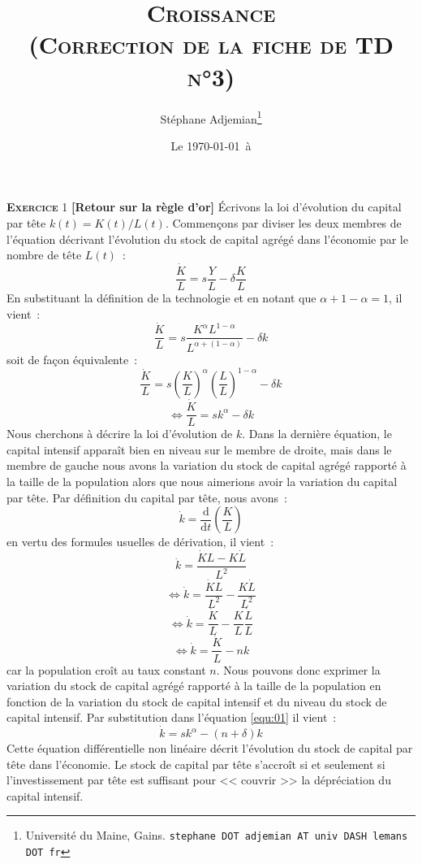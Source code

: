 \documentclass[10pt,a4paper,notitlepage,onecolumn]{article}
\title{\textsc{Croissance\\ \small{(Correction de la fiche de TD n°3)}}}
\author{Stéphane Adjemian\thanks{Université du Maine, Gains. \texttt{stephane DOT adjemian AT univ DASH lemans DOT fr}}}
\date{Le \today\ à \thistime}
\newcommand{\exercice}[2]{\textsc{\textbf{Exercice}} #1 \textbf{[#2]}}
\begin{document}
\maketitle

\exercice{1}{Retour sur la règle d'or} Écrivons la loi d'évolution du capital par
tête $k(t) = K(t)/L(t)$. Commençons par diviser les deux membres de
l'équation décrivant l'évolution du stock de capital agrégé dans
l'économie par le nombre de tête $L(t)$~:
\[
\frac{\dot{K}}{L} = s \frac{Y}{L} - \delta \frac{K}{L}
\]
En substituant la définition de la technologie et en notant que
$\alpha+1-\alpha = 1$, il vient~:
\[
\frac{\dot{K}}{L} = s
\frac{K^{\alpha}L^{1-\alpha}}{L^{\alpha+(1-\alpha)}} - \delta k
\]
soit de façon équivalente~:
\[
\frac{\dot{K}}{L} = s
\left(\frac{K}{L}\right)^{\alpha}\left(\frac{L}{L}\right)^{1-\alpha}
- \delta k
\]
\begin{equation}\label{equ:01}
\Leftrightarrow \frac{\dot{K}}{L} = s k^{\alpha} - \delta k
\end{equation}
Nous cherchons à décrire la loi d'évolution de $k$. Dans la dernière
équation, le capital intensif apparaît bien en niveau sur le membre
de droite, mais dans le membre de gauche nous avons la variation du
stock de capital agrégé rapporté à la taille de la population alors
que nous aimerions avoir la variation du capital par tête. Par
définition du capital par tête, nous avons~:
\[
\dot{k} = \frac{\mathrm d}{\mathrm dt}\left(\frac{K}{L}\right)
\]
en vertu des formules usuelles de dérivation, il vient~:
\[
\dot{k} = \frac{\dot{K}L-K\dot{L}}{L^2}
\]
\[
\Leftrightarrow \dot{k} = \frac{\dot{K}L}{L^2}-\frac{K\dot{L}}{L^2}
\]
\[
\Leftrightarrow \dot{k} =
\frac{\dot{K}}{L}-\frac{K}{L}\frac{\dot{L}}{L}
\]
\[
\Leftrightarrow \dot{k} = \frac{\dot{K}}{L}-nk
\]
car la population croît au taux constant $n$. Nous pouvons donc
exprimer la variation du stock de capital agrégé rapporté à la
taille de la population en fonction de la variation du stock de
capital intensif et du niveau du stock de capital intensif. Par
substitution dans l'équation \ref{equ:01} il vient~:
\[
\dot{k} = s k^{\alpha} - (n+\delta) k
\]
Cette équation différentielle non linéaire décrit l'évolution du
stock de capital par tête dans l'économie. Le stock de capital par
tête s'accroît si et seulement si l'investissement par tête est
suffisant pour << couvrir >> la dépréciation du capital
intensif.\newline 
\end{document}
